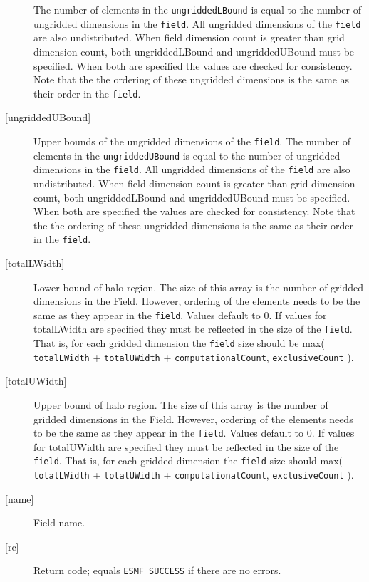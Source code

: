 \begin{description}
   The number of elements in the {\tt ungriddedLBound} is equal to the number of ungridded
   dimensions in the {\tt field}. All ungridded dimensions of the
   {\tt field} are also undistributed. When field dimension count is
   greater than grid dimension count, both ungriddedLBound and ungriddedUBound
   must be specified. When both are specified the values are checked
   for consistency. Note that the the ordering of
   these ungridded dimensions is the same as their order in the {\tt field}.
   \item [{[ungriddedUBound]}]
   Upper bounds of the ungridded dimensions of the {\tt field}.
   The number of elements in the {\tt ungriddedUBound} is equal to the number of ungridded
   dimensions in the {\tt field}. All ungridded dimensions of the
   {\tt field} are also undistributed. When field dimension count is
   greater than grid dimension count, both ungriddedLBound and ungriddedUBound
   must be specified. When both are specified the values are checked
   for consistency. Note that the the ordering of
   these ungridded dimensions is the same as their order in the {\tt field}.
   \item [{[totalLWidth]}]
   Lower bound of halo region. The size of this array is the number
   of gridded dimensions in the Field. However, ordering of the elements
   needs to be the same as they appear in the {\tt field}. Values default
   to 0. If values for totalLWidth are specified they must be reflected in
   the size of the {\tt field}. That is, for each gridded dimension the
   {\tt field} size should be max( {\tt totalLWidth} + {\tt totalUWidth}
   + {\tt computationalCount}, {\tt exclusiveCount} ).
   \item [{[totalUWidth]}]
   Upper bound of halo region. The size of this array is the number
   of gridded dimensions in the Field. However, ordering of the elements
   needs to be the same as they appear in the {\tt field}. Values default
   to 0. If values for totalUWidth are specified they must be reflected in
   the size of the {\tt field}. That is, for each gridded dimension the
   {\tt field} size should max( {\tt totalLWidth} + {\tt totalUWidth}
   + {\tt computationalCount}, {\tt exclusiveCount} ).
   \item [{[name]}]
   Field name.
   \item [{[rc]}]
   Return code; equals {\tt ESMF\_SUCCESS} if there are no errors.
   \end{description} 
 

